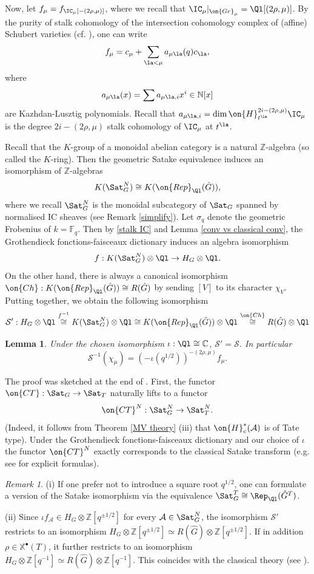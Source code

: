 \documentclass[]{pcmi}
\theoremstyle{plain}
\newtheorem{lem}[equation]{Lemma}
\theoremstyle{remark}
\newtheorem{rmk}[equation]{Remark}
\theoremstyle{definition}
\newcommand{\bC}{{\mathbb C}}
\newcommand{\bF}{{\mathbb F}}
\newcommand{\bN}{{\mathbb N}}
\newcommand{\bZ}{{\mathbb Z}}
\newcommand{\mA}{{\mathcal A}}
\newcommand{\mS}{{\mathcal S}}
\newcommand{\Gr}{{\on{Gr}}}
\def\xch{\mathbb{X}^\bullet}
\begin{document}
Now, let $f_\mu=f_{\IC_\mu[-(2\rho,\mu)]}$, where we recall that $\IC_\mu|_{\Gr_\mu}=\Ql[(2\rho,\mu)]$. By the purity of stalk cohomology of the intersection cohomology complex of (affine) Schubert varieties (cf. \cite{KL}), one can write
\begin{equation}\label{stalk IC}
f_\mu=c_\mu+\sum_{\la<\mu}a_{\mu\la}(q)c_\la,
\end{equation}
where $$a_{\mu\la}(x)=\sum a_{\mu\la,i}x^i\in \bN[x]$$ are Kazhdan-Lusztig polynomials.
Recall that $a_{\mu\la,i}=\dim \on{H}^{2i-(2\rho,\mu)}_{t^\la}\IC_\mu$ is the degree $2i-(2\rho,\mu)$ stalk cohomology of $\IC_\mu$ at $t^\la$. 

Recall that the $K$-group of a monoidal abelian category is a natural $\bZ$-algebra (so called the $K$-ring). Then the geometric Satake equivalence induces an isomorphism of $\bZ$-algebras
\[K(\Sat_G^N)\cong K(\on{Rep}_\Ql(\hat G)),\]
where we recall $\Sat_G^N$ is the monoidal subcategory of $\Sat_G$ spanned by normalised IC sheaves (see Remark \ref{simplify}). 
Let $\sigma_q$ denote the geometric Frobenius of $k=\bF_q$. Then 
by \eqref{stalk IC} and Lemma \ref{conv vs classical conv}, the Grothendieck fonctions-faisceaux dictionary induces an algebra isomorphism
\[f: K(\Sat_G^N)\otimes\Ql\to H_G\otimes\Ql.\]
On the other hand, there is always a canonical isomorphism $\on{Ch}:K(\on{Rep}_\Ql(\hat G))\cong R(\hat G)$ by sending $[V]$ to its character $\chi_V$. Putting together, we obtain the following isomorphism
\[
\mS':H_G\otimes\Ql\stackrel{f^{-1}}{\cong} K(\Sat_G^N)\otimes\Ql \cong K(\on{Rep}_\Ql(\hat G))\otimes\Ql\stackrel{\on{Ch}}{\cong}R(\hat G)\otimes\Ql
\]
\begin{lem}Under the chosen isomorphism $\iota:\Ql\cong\bC$, $\mS'=\mS$. In particular
$$\mS^{-1}(\chi_\mu)=(-\iota(q^{1/2}))^{-(2\rho,\mu)}f_\mu.$$
\end{lem}

The proof was sketched at the end of \cite{RZ}. First, the functor $\on{CT}:\Sat_G\to \Sat_T$ naturally lifts to a functor 
$$\on{CT}^N: \Sat_G^N\to \Sat_T^N.$$ 
(Indeed, it follows from Theorem \ref{MV theory} (iii) that $\on{H}_c^*(\mA)$ is of Tate type).
Under the Grothendieck fonctions-faisceaux dictionary and our choice of $\iota$ the functor $\on{CT}^N$ exactly corresponds to the classical Satake transform (e.g. see \cite[\S\ 3]{Gr} for explicit formulas). 

\begin{rmk}
(i) If one prefer not to introduce a square root $q^{1/2}$, one can formulate a version of the Satake isomorphism via the equivalence $\Sat_G^T\cong \Rep_\Ql(\hat G^T)$. 

(ii) Since $\iota f_\mA\in H_G\otimes\bZ[q^{\pm 1/2}]$ for every $\mA\in \Sat_G^N$, the isomorphism $\mS'$ restricts to an isomorphism $H_G\otimes \bZ[q^{\pm 1/2}]\simeq R(\hat G)\otimes \bZ[q^{\pm 1/2}]$. If in addition $\rho\in \xch(T)$, it further restricts to an isomorphism $H_G\otimes\bZ[q^{-1}]\simeq R(\hat G)\otimes\bZ[q^{-1}]$. This coincides with the classical theory (see \cite[\S 3]{Gr}).
\end{rmk}
\end{document}
